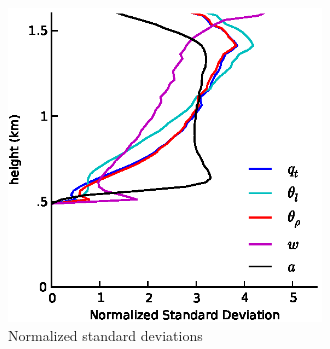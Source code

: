 \documentclass[acp]{copernicus}
\begin{document}
\begin{figure}[t]
\vspace*{2mm}
\begin{center}
\includegraphics[width=8.3cm]{./figures/st_dev}
\end{center}
\caption{Normalized standard deviations}
\label{fig:st_dev}
\end{figure}





\end{document}
